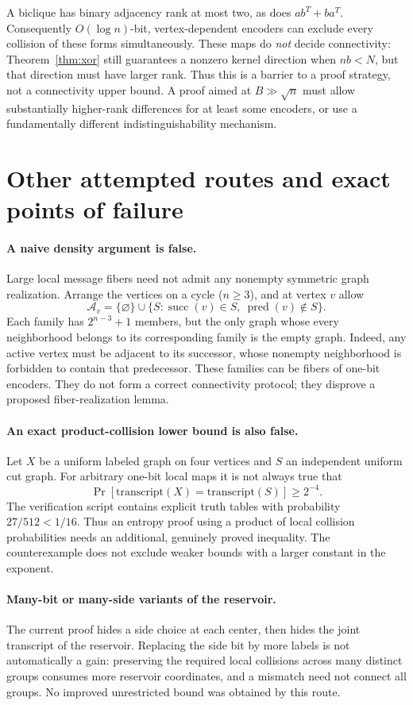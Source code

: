 \documentclass[11pt]{article}
\theoremstyle{definition}\newtheorem{definition}[theorem]{Definition}
\theoremstyle{remark}\newtheorem{remark}[theorem]{Remark}
\begin{document}
A biclique has binary adjacency rank at most two, as does $ab^T+ba^T$. Consequently $O(\log n)$-bit, vertex-dependent encoders can exclude every collision of these forms simultaneously. These maps do \emph{not} decide connectivity: Theorem~\ref{thm:xor} still guarantees a nonzero kernel direction when $nb<N$, but that direction must have larger rank. Thus this is a barrier to a proof strategy, not a connectivity upper bound. A proof aimed at $B\gg\sqrt n$ must allow substantially higher-rank differences for at least some encoders, or use a fundamentally different indistinguishability mechanism.

\section{Other attempted routes and exact points of failure}
\paragraph{A naive density argument is false.}
Large local message fibers need not admit any nonempty symmetric graph realization. Arrange the vertices on a cycle ($n\ge3$), and at vertex $v$ allow
\[
 \mathcal A_v=\{\varnothing\}\cup
 \{S:\operatorname{succ}(v)\in S,\ \operatorname{pred}(v)\notin S\}.
\]
Each family has $2^{n-3}+1$ members, but the only graph whose every neighborhood belongs to its corresponding family is the empty graph. Indeed, any active vertex must be adjacent to its successor, whose nonempty neighborhood is forbidden to contain that predecessor. These families can be fibers of one-bit encoders. They do not form a correct connectivity protocol; they disprove a proposed fiber-realization lemma.

\paragraph{An exact product-collision lower bound is also false.}
Let $X$ be a uniform labeled graph on four vertices and $S$ an independent uniform cut graph. For arbitrary one-bit local maps it is not always true that
\[
 \Pr[\text{transcript}(X)=\text{transcript}(S)]\ge2^{-4}.
\]
The verification script contains explicit truth tables with probability $27/512<1/16$. Thus an entropy proof using a product of local collision probabilities needs an additional, genuinely proved inequality. The counterexample does not exclude weaker bounds with a larger constant in the exponent.

\paragraph{Many-bit or many-side variants of the reservoir.}
The current proof hides a side choice at each center, then hides the joint transcript of the reservoir. Replacing the side bit by more labels is not automatically a gain: preserving the required local collisions across many distinct groups consumes more reservoir coordinates, and a mismatch need not connect all groups. No improved unrestricted bound was obtained by this route.
\end{document}
